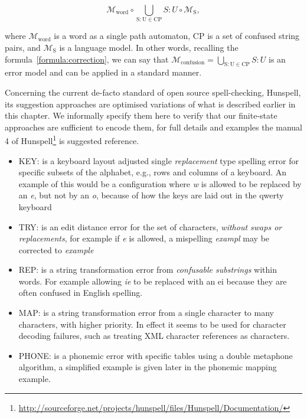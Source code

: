 \documentclass[a4paper,12pt]{article}
\begin{document}
\begin{equation}
\mathcal{M}_{\mathrm{word}} \circ \bigcup_{\mathrm{S:U} \in \mathrm{CP}} S:U  \circ \mathcal{M}_{\mathrm{S}},
\end{equation}

where $\mathcal{M}_{\mathrm{word}}$ is a word as a single path automaton,
$\mathrm{CP}$ is a set of confused string pairs, and
$\mathcal{M}_{\mathrm{S}}$ is a language model. In other words, recalling the
formula~\ref{formula:correction}, we can say that
$\mathcal{M}_{\mathrm{confusion}} = \bigcup_{\mathrm{S:U} \in \mathrm{CP}} S:U$
is an error model and can be applied in a standard manner.

Concerning the current de-facto standard of open source spell-checking,
Hunspell, its suggestion approaches are optimised variations of what is
described earlier in this chapter. We informally specify them here to
verify that our finite-state approaches are sufficient to encode
them, for full details and examples the manual 4 of
Hunspell\footnote{\url{http://sourceforge.net/projects/hunspell/files/Hunspell/Documentation/}} is suggested reference.

\begin{itemize}
    \item KEY: is a keyboard layout adjusted single \emph{replacement} type
        spelling error for specific subsets of the alphabet, e.g., rows and 
        columns of a keyboard. An example of this would be a configuration
        where \emph{w} is allowed to be replaced by an \emph{e}, but not
        by an \emph{o}, because of how the keys are laid out in the qwerty
        keyboard
    \item TRY: is an edit distance error for the set of characters, 
        \emph{without swaps or replacements}, for example if \emph{e} is
        allowed, a mispelling \emph{exampl} may be corrected to \emph{example}
    \item REP: is a string transformation error from \emph{confusable
        substrings} within words. For example allowing \emph{ie} to be replaced
        with an {ei} because they are often confused in English spelling.
    \item MAP: is a string transformation error from a single character to 
        many characters, with higher priority. In effect it seems to be
        used for character decoding failures, such as treating XML character
        references as characters.
    \item PHONE: is a phonemic error with specific tables using a double
        metaphone algorithm, a simplified example is given later in the
        phonemic mapping example.
\end{itemize}
\end{document}
